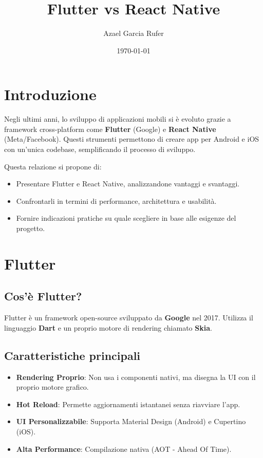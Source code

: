 \documentclass[a4paper,12pt]{article}
\title{\textbf{Flutter vs React Native}}
\author{Azael Garcia Rufer}
\date{\today}
\begin{document}
\maketitle

\tableofcontents
\newpage

\section{Introduzione}
Negli ultimi anni, lo sviluppo di applicazioni mobili si è evoluto grazie a framework cross-platform come \textbf{Flutter} (Google) e \textbf{React Native} (Meta/Facebook). Questi strumenti permettono di creare app per Android e iOS con un’unica codebase, semplificando il processo di sviluppo.

Questa relazione si propone di:
\begin{itemize}
    \item Presentare Flutter e React Native, analizzandone vantaggi e svantaggi.
    \item Confrontarli in termini di performance, architettura e usabilità.
    \item Fornire indicazioni pratiche su quale scegliere in base alle esigenze del progetto.
\end{itemize}

\section{Flutter}
\subsection{Cos’è Flutter?}
Flutter è un framework open-source sviluppato da \textbf{Google} nel 2017. Utilizza il linguaggio \textbf{Dart} e un proprio motore di rendering chiamato \textbf{Skia}.

\subsection{Caratteristiche principali}
\begin{itemize}
    \item \textbf{Rendering Proprio}: Non usa i componenti nativi, ma disegna la UI con il proprio motore grafico.
    \item \textbf{Hot Reload}: Permette aggiornamenti istantanei senza riavviare l’app.
    \item \textbf{UI Personalizzabile}: Supporta Material Design (Android) e Cupertino (iOS).
    \item \textbf{Alta Performance}: Compilazione nativa (AOT - Ahead Of Time).
\end{itemize}
\end{document}
